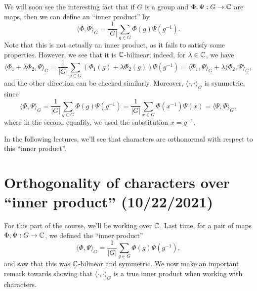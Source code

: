 We will soon see the interesting fact that if $G$ is a group and 
$\Phi, \Psi : G \to \mathbb{C}$ are maps, then we can define an ``inner product'' by 
\[ \langle \Phi, \Psi \rangle_G = \frac{1}{|G|} \sum_{g \in G} \Phi(g) 
\Psi(g^{-1}). \] 
Note that this is not actually an inner product, as it fails to satisfy 
some properties. However, we see that it is $\mathbb{C}$-bilinear; indeed, for 
$\lambda \in \mathbb{C}$, we have 
\[ \langle \Phi_1 + \lambda\Phi_2, \Psi \rangle_G = 
\frac{1}{|G|} \sum_{g \in G} (\Phi_1(g) + \lambda\Phi_2(g)) \Psi(g^{-1}) 
= \langle \Phi_1, \Psi \rangle_G + \lambda \langle \Phi_2, \Psi \rangle_G, \] 
and the other direction can be checked similarly. Moreover, 
$\langle \cdot, \cdot \rangle_G$ is symmetric, since 
\[ \langle \Phi, \Psi \rangle_G = \frac1{|G|} \sum_{g\in G} 
\Phi(g) \Psi(g^{-1}) = \frac1{|G|} \sum_{x\in G} \Phi(x^{-1}) \Psi(x) 
= \langle \Psi, \Phi \rangle_G, \] 
where in the second equality, we used the substitution $x = g^{-1}$. 

In the following lectures, we'll see that characters are orthonormal with respect 
to this ``inner product''. 

\section{Orthogonality of characters over ``inner product'' (10/22/2021)}
For this part of the course, we'll be working over $\mathbb{C}$. Last time, 
for a pair of maps $\Phi, \Psi : G \to \mathbb{C}$, we defined the ``inner product''
\[ \langle \Phi, \Psi \rangle_G = \frac{1}{|G|} \sum_{g \in G} \Phi(g) 
\Psi(g^{-1}), \] 
and saw that this was $\mathbb{C}$-bilinear and symmetric. We now make an important 
remark towards showing that $\langle \cdot, \cdot \rangle_G$ is a 
true inner product when working with characters. 

